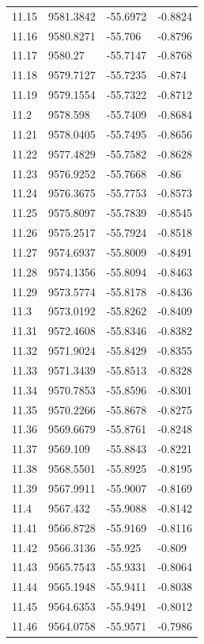 \begin{table}[H]
\begin{tabular}{llll}
11.15 & 9581.3842 & -55.6972 & -0.8824 \\
11.16 & 9580.8271 & -55.706 & -0.8796 \\
11.17 & 9580.27 & -55.7147 & -0.8768 \\
11.18 & 9579.7127 & -55.7235 & -0.874 \\
11.19 & 9579.1554 & -55.7322 & -0.8712 \\
11.2 & 9578.598 & -55.7409 & -0.8684 \\
11.21 & 9578.0405 & -55.7495 & -0.8656 \\
11.22 & 9577.4829 & -55.7582 & -0.8628 \\
11.23 & 9576.9252 & -55.7668 & -0.86 \\
11.24 & 9576.3675 & -55.7753 & -0.8573 \\
11.25 & 9575.8097 & -55.7839 & -0.8545 \\
11.26 & 9575.2517 & -55.7924 & -0.8518 \\
11.27 & 9574.6937 & -55.8009 & -0.8491 \\
11.28 & 9574.1356 & -55.8094 & -0.8463 \\
11.29 & 9573.5774 & -55.8178 & -0.8436 \\
11.3 & 9573.0192 & -55.8262 & -0.8409 \\
11.31 & 9572.4608 & -55.8346 & -0.8382 \\
11.32 & 9571.9024 & -55.8429 & -0.8355 \\
11.33 & 9571.3439 & -55.8513 & -0.8328 \\
11.34 & 9570.7853 & -55.8596 & -0.8301 \\
11.35 & 9570.2266 & -55.8678 & -0.8275 \\
11.36 & 9569.6679 & -55.8761 & -0.8248 \\
11.37 & 9569.109 & -55.8843 & -0.8221 \\
11.38 & 9568.5501 & -55.8925 & -0.8195 \\
11.39 & 9567.9911 & -55.9007 & -0.8169 \\
11.4 & 9567.432 & -55.9088 & -0.8142 \\
11.41 & 9566.8728 & -55.9169 & -0.8116 \\
11.42 & 9566.3136 & -55.925 & -0.809 \\
11.43 & 9565.7543 & -55.9331 & -0.8064 \\
11.44 & 9565.1948 & -55.9411 & -0.8038 \\
11.45 & 9564.6353 & -55.9491 & -0.8012 \\
11.46 & 9564.0758 & -55.9571 & -0.7986 \\

\end{tabular}
\end{table}
